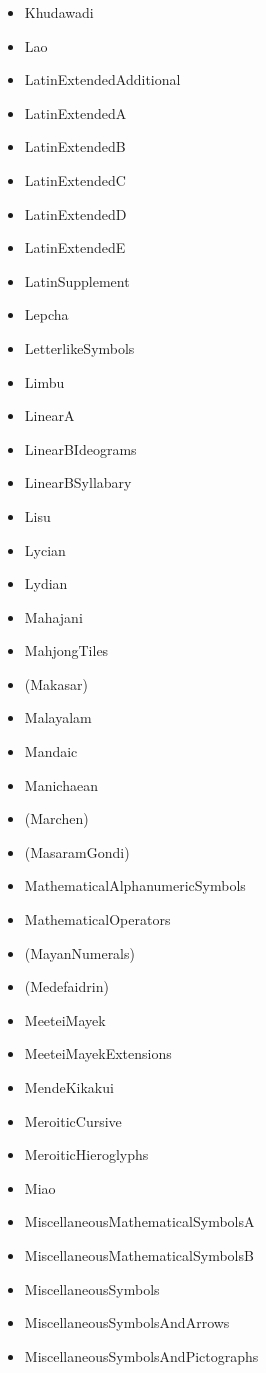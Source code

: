 \documentclass{article}
\newenvironment{itemlist}{%
  \begin{itemize}
	\setlength{\itemsep}{0pt}
	\setlength{\parsep}{0pt}
	\setlength{\topsep}{0pt}
	\setlength{\partopsep}{0pt}
	\setlength{\parskip}{0pt}
	\setlength{\labelsep}{5pt}}%
{
  \end{itemize}}
\begin{document}
\begin{multicols*}{2}
\begin{itemlist}
				\item Khudawadi
				\item Lao
				\item LatinExtendedAdditional
				\item LatinExtendedA
				\item LatinExtendedB
				\item LatinExtendedC
				\item LatinExtendedD
				\item LatinExtendedE
				\item LatinSupplement
				\item Lepcha
				\item LetterlikeSymbols
				\item Limbu
				\item LinearA
				\item LinearBIdeograms
				\item LinearBSyllabary
				\item Lisu
				\item Lycian
				\item Lydian
				\item Mahajani
				\item MahjongTiles
				\item (Makasar)
				\item Malayalam
				\item Mandaic
				\item Manichaean
				\item (Marchen)
				\item (MasaramGondi)
				\item MathematicalAlphanumericSymbols
				\item MathematicalOperators
				\item (MayanNumerals)
				\item (Medefaidrin)
				\item MeeteiMayek
				\item MeeteiMayekExtensions
				\item MendeKikakui
				\item MeroiticCursive
				\item MeroiticHieroglyphs
				\item Miao
				\item MiscellaneousMathematicalSymbolsA
				\item MiscellaneousMathematicalSymbolsB
				\item MiscellaneousSymbols
				\item MiscellaneousSymbolsAndArrows
				\item MiscellaneousSymbolsAndPictographs

\end{itemlist}
\end{multicols*}
\end{document}
